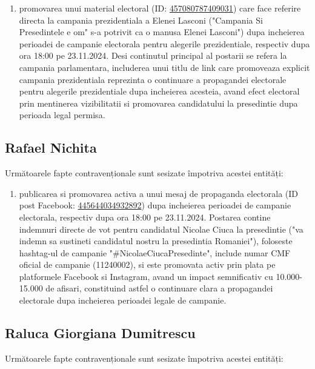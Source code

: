 \documentclass[a4paper,12pt]{article}
\begin{document}
\begin{enumerate}[leftmargin=*, label=\arabic*.)]
    \item promovarea unui material electoral (ID: \href{https://www.facebook.com/ads/library/?id=457080787409031}{457080787409031}) care face referire directa la campania prezidentiala a Elenei Lasconi ("Campania Si Presedintele e om" s-a potrivit ca o manusa Elenei Lasconi") dupa incheierea perioadei de campanie electorala pentru alegerile prezidentiale, respectiv dupa ora 18:00 pe 23.11.2024. Desi continutul principal al postarii se refera la campania parlamentara, includerea unui titlu de link care promoveaza explicit campania prezidentiala reprezinta o continuare a propagandei electorale pentru alegerile prezidentiale dupa incheierea acesteia, avand efect electoral prin mentinerea vizibilitatii si promovarea candidatului la presedintie dupa perioada legal permisa.
\end{enumerate}

\vspace{0.5cm}

\subsection{Rafael Nichita}
Următoarele fapte contravenționale sunt sesizate împotriva acestei entități:

\begin{enumerate}[leftmargin=*, label=\arabic*.)]
    \item publicarea si promovarea activa a unui mesaj de propaganda electorala (ID post Facebook: \href{https://www.facebook.com/ads/library/?id=445644034932892}{445644034932892}) dupa incheierea perioadei de campanie electorala, respectiv dupa ora 18:00 pe 23.11.2024. Postarea contine indemnuri directe de vot pentru candidatul Nicolae Ciuca la presedintie ("va indemn sa sustineti candidatul nostru la presedintia Romaniei"), foloseste hashtag-ul de campanie "\#NicolaeCiucaPresedinte", include numar CMF oficial de campanie (11240002), si este promovata activ prin plata pe platformele Facebook si Instagram, avand un impact semnificativ cu 10.000-15.000 de afisari, constituind astfel o continuare clara a propagandei electorale dupa incheierea perioadei legale de campanie.
\end{enumerate}

\vspace{0.5cm}

\subsection{Raluca Giorgiana Dumitrescu}
Următoarele fapte contravenționale sunt sesizate împotriva acestei entități:
\end{document}
